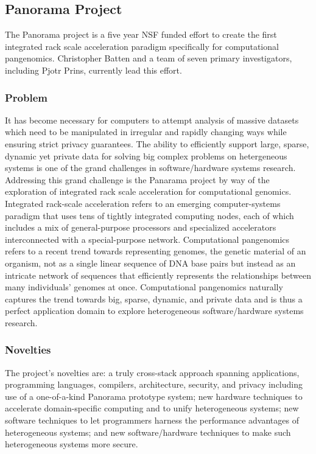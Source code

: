 \subsection{Panorama Project}

The Panorama project is a five year NSF funded effort to create the first integrated rack scale acceleration paradigm specifically for computational pangenomics.
Christopher Batten and a team of seven primary investigators, including Pjotr Prins, currently lead this effort.

\subsubsection{Problem}
It has become necessary for computers to attempt analysis of massive datasets which need to be manipulated in irregular and rapidly changing ways while ensuring strict privacy guarantees.  
The ability to efficiently support large, sparse, dynamic yet private data for solving big complex problems on hetergeneous systems is one of the grand challenges in software/hardware systems research.
Addressing this grand challenge is the Panarama project by way of the exploration of integrated rack scale acceleration for computational genomics.
Integrated rack-scale acceleration refers to an emerging computer-systems paradigm that uses tens of tightly integrated computing nodes, each of which includes a mix of general-purpose processors and specialized accelerators interconnected with a special-purpose network. 
Computational pangenomics refers to a recent trend towards representing genomes, the genetic material of an organism, not as a single linear sequence of DNA base pairs but instead as an intricate network of sequences that efficiently represents the relationships between many individuals' genomes at once. 
Computational pangenomics naturally captures the trend towards big, sparse, dynamic, and private data and is thus a perfect application domain to explore heterogeneous software/hardware systems research. 

\subsubsection{Novelties}
The project's novelties are: a truly cross-stack approach spanning applications, programming languages, compilers, architecture, security, and privacy including use of a one-of-a-kind Panorama prototype system; new hardware techniques to accelerate domain-specific computing and to unify heterogeneous systems; new software techniques to let programmers harness the performance advantages of heterogeneous systems; and new software/hardware techniques to make such heterogeneous systems more secure.

